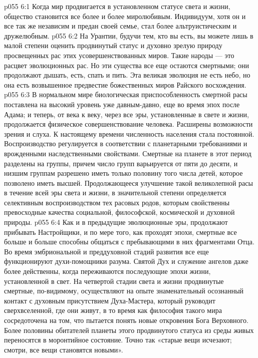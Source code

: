 \vs p055 6:1 Когда мир продвигается в установленном статусе света и жизни, общество становится все более и более миролюбивым. Индивидуум, хотя он и все так же независим и предан своей семье, стал более альтруистическим и дружелюбным.
\vs p055 6:2 На Урантии, будучи тем, кто вы есть, вы можете лишь в малой степени оценить продвинутый статус и духовно зрелую природу просвещенных рас этих усовершенствованных миров. Такие народы --- это расцвет эволюционных рас. Но эти существа все еще остаются смертными; они продолжают дышать, есть, спать и пить. Эта великая эволюция не есть небо, но она есть возвышенное предвестие божественных миров Райского восхождения.
\vs p055 6:3 В нормальном мире биологическая приспособленность смертной расы поставлена на высокий уровень уже давным\hyp{}давно, еще во время эпох после Адама; и теперь, от века к веку, через все эры, установленные в свете и жизни, продолжается физическое совершенствование человека. Расширены возможности зрения и слуха. К настоящему времени численность населения стала постоянной. Воспроизводство регулируется в соответствии с планетарными требованиями и врожденными наследственными свойствами. Смертные на планете в этот период разделены на группы, причем число групп варьируется от пяти до десяти, и низшим группам разрешено иметь только половину того числа детей, которое позволено иметь высшей. Продолжающееся улучшение такой великолепной расы в течение всей эры света и жизни, в значительной степени определяется селективным воспроизводством тех расовых родов, которым свойственны превосходные качества социальной, философской, космической и духовной природы.
\vs p055 6:4 \pc Как и в предыдущие эволюционные эры, продолжают прибывать Настройщики, и по мере того, как проходят эпохи, смертные все больше и больше способны общаться с пребывающими в них фрагментами Отца. Во время эмбриональной и преддуховной стадий развития все еще функционируют духи\hyp{}помощники разума. Святой Дух и служение ангелов даже более действенны, когда переживаются последующие эпохи жизни, установленной в свет. На четвертой стадии света и жизни продвинутые смертные, по\hyp{}видимому, осуществляют на опыте знаменательный осознанный контакт с духовным присутствием Духа\hyp{}Мастера, который руководит сверхвселенной, где они живут, в то время как философия такого мира сосредоточена на том, что пытается понять новые откровения Бога Верховного. Более половины обитателей планеты этого продвинутого статуса из среды живых переносятся в моронтийное состояние. Точно так «старые вещи исчезают; смотри, все вещи становятся новыми».
